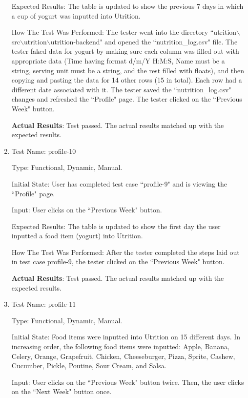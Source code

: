 \documentclass[12pt, titlepage]{article}
\begin{document}
\begin{enumerate}
		Expected Results: The table is updated to show the previous 7 days in which a cup of yogurt was inputted into Utrition. 
		
		How The Test Was Performed: The tester went into the directory ``utrition$\backslash$src$\backslash$utrition$\backslash$utrition-backend" and opened the ``nutrition\_log.csv" file. The tester faked data for yogurt by making sure each column was filled out with appropriate data (Time having format d/m/Y H:M:S, Name must be a string, serving unit must be a string, and the rest filled with floats), and then copying and pasting the data for 14 other rows (15 in total). Each row had a different date associated with it. The tester saved the ``nutrition\_log.csv" changes and refreshed the ``Profile" page. The tester clicked on the ``Previous Week" button.
		
		\textbf{Actual Results}: Test passed. The actual results matched up with the expected results.
		
		\item{Test Name: profile-10}
		
		Type: Functional, Dynamic, Manual.
		
		Initial State: User has completed test case ``profile-9" and is viewing the ``Profile" page.
		
		Input: User clicks on the ``Previous Week" button.
		
		Expected Results: The table is updated to show the first day the user inputted a food item (yogurt) into Utrition.
		
		How The Test Was Performed: After the tester completed the steps laid out in test case profile-9, the tester clicked on the ``Previous Week" button.
		
		\textbf{Actual Results}: Test passed. The actual results matched up with the expected results.
		
		\item{Test Name: profile-11}
		
		Type: Functional, Dynamic, Manual.
		
		Initial State: Food items were inputted into Utrition on 15 different days. In increasing order, the following food items were inputted: Apple, Banana, Celery, Orange, Grapefruit, Chicken, Cheeseburger, Pizza, Sprite, Cashew, Cucumber, Pickle, Poutine, Sour Cream, and Salsa.
		
		Input: User clicks on the ``Previous Week" button twice. Then, the user clicks on the ``Next Week" button once.
		

\end{enumerate}
\end{document}
